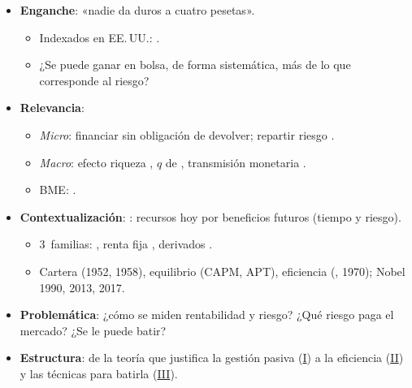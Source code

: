 \documentclass{article}
\begin{document}
\cabecerarepaso
\begin{columnas}

\begin{itemize}
\item \textbf{Enganche}: «nadie da duros a cuatro pesetas».
  \begin{itemize}
  \item Indexados en EE.\,UU.: .
  \item ¿Se puede ganar en bolsa, de forma sistemática, más de lo que corresponde al riesgo?
  \end{itemize}
\item \textbf{Relevancia}:
  \begin{itemize}
  \item \emph{Micro}: financiar sin obligación de devolver; repartir riesgo .
  \item \emph{Macro}: efecto riqueza , $q$ de  , transmisión monetaria .
  \item BME: .
  \end{itemize}
\item \textbf{Contextualización}: : recursos hoy por beneficios futuros (tiempo y riesgo).
  \begin{itemize}
  \item 3~familias: , renta fija , derivados .
  \item Cartera (1952, 1958), equilibrio (CAPM, APT), eficiencia (, 1970); Nobel 1990, 2013, 2017.
  \end{itemize}
\item \textbf{Problemática}: ¿cómo se miden rentabilidad y riesgo? ¿Qué riesgo paga el mercado? ¿Se le puede batir?
\item \textbf{Estructura}: de la teoría que justifica la gestión pasiva (\hyperref[rep:I]{I}) a la eficiencia (\hyperref[rep:II]{II}) y las técnicas para batirla (\hyperref[rep:III]{III}).
\end{itemize}


\end{columnas}
\end{document}
